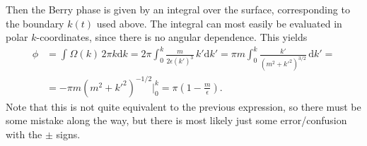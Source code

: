 \documentclass[english, parskip=full]{scrartcl}
\newcommand{\intx}{}
\newcommand{\kla}{}
\newcommand{\tecxt}{}
\renewcommand{\i}{\text{i}}
\begin{document}
Then the Berry phase is given by an integral over the surface, corresponding to the boundary $k(t)$ used above.
The integral can most easily be evaluated in polar $k$-coordinates, since there is no angular dependence.
This yields
\begin{align}
\phi &= \intx\int_{ }^{ }\Omega(k)\, 2\pi k\mathrm{d}k = 2\pi\intx\int_{0}^{k} \frac{m}{2\epsilon(k')^3}\, k'\mathrm{d}k' = \pi m\intx\int_{0}^{k}\frac{k'}{\kla\left( m^2 + k'^2 \right)^{3/2}}\, \mathrm{d}k' = \\
&= -\pi m\kla\left( m^2 + k'^2 \right)^{-1/2}\Big\vert_0^k  = \pi \kla\left( 1 - \frac{m}{\epsilon} \right).
\end{align}
Note that this is not quite equivalent to the previous expression, so there must be some mistake along the way, but there is most likely just some error/confusion with the $\pm$ signs.




\newpage
\end{document}
